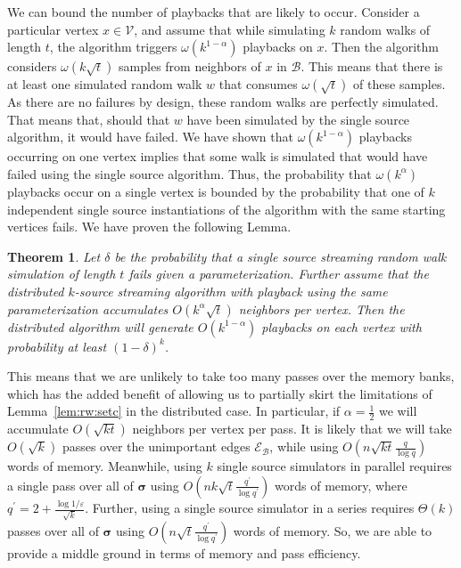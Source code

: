 \documentclass[10]{report}
\newtheorem{theorem}{Theorem}[section]
\begin{document}
We can bound the number of playbacks that are likely to occur.
Consider a particular vertex $x \in \mathcal{V}$, and assume that while simulating $k$ random walks of length $t$, the algorithm triggers $\omega \left ( k^{1 - \alpha} \right )$ playbacks on $x$.
Then the algorithm considers $\omega \left ( k \sqrt{t}\right )$ samples from neighbors of $x$ in $\mathcal{B}$. 
This means that there is at least one simulated random walk $w$ that consumes $\omega(\sqrt{t})$ of these samples.
As there are no failures by design, these random walks are perfectly simulated.
That means that, should that $w$ have been simulated by the single source algorithm, it would have failed. 
We have shown that $\omega(k^{1 - \alpha})$ playbacks occurring on one vertex implies that some walk is simulated that would have failed using the single source algorithm. 
Thus, the probability that $\omega(k^\alpha)$ playbacks occur on a single vertex is bounded by the probability that one of $k$ independent single source instantiations of the algorithm with the same starting vertices fails. 
We have proven the following Lemma.

\begin{theorem} \label{thm:playback:bound}
Let $\delta$ be the probability that a single source streaming random walk simulation of length $t$ fails given a parameterization.
Further assume that the distributed $k$-source streaming algorithm with playback using the same parameterization accumulates $O(k^\alpha \sqrt{t})$ neighbors per vertex.
Then the distributed algorithm will generate $O(k^{1-\alpha})$ playbacks on each vertex with probability at least $(1 - \delta)^k$.
\end{theorem}

This means that we are unlikely to take too many passes over the memory banks, which has the added benefit of allowing us to partially skirt the limitations of Lemma~\ref{lem:rw:setc} in the distributed case.
In particular, if $\alpha=\frac{1}{2}$ we will accumulate $O(\sqrt{kt})$ neighbors per vertex per pass.
It is likely that we will take $O(\sqrt{k})$ passes over the unimportant edges $\mathcal{E}_\mathcal{B}$, while using $O \left (n\sqrt{kt}\frac{q}{\log q} \right )$ words of memory.
Meanwhile, using $k$ single source simulators in parallel requires a single pass over all of $\boldsymbol{\sigma}$ using $O\left (nk\sqrt{t}\frac{q^\prime}{\log q^\prime} \right )$ words of memory, where $q^\prime = 2 + \frac{\log 1/\varepsilon}{\sqrt{k}}$.
Further, using a single source simulator in a series requires $\Theta(k)$ passes over all of $\boldsymbol{\sigma}$ using $O\left (n\sqrt{t}\frac{q^\prime}{\log q^\prime} \right )$ words of memory.
So, we are able to provide a middle ground in terms of memory and pass efficiency.
\end{document}
